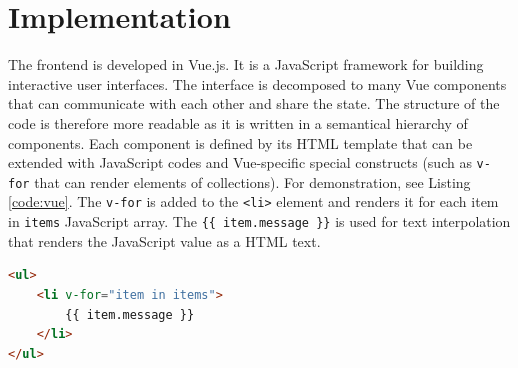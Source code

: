 \section{Implementation}
The frontend is developed in Vue.js. It is a JavaScript framework for building
interactive user interfaces. The interface is decomposed to many Vue components
that can communicate with each other and share the state. The structure of the
code is therefore more readable as it is written in a semantical hierarchy of
components. Each component is defined by its HTML template that can be extended
with JavaScript codes and Vue-specific special constructs (such as
\texttt{v-for} that can render elements of collections). For demonstration,
see Listing \ref{code:vue}. The \texttt{v-for} is added to the \texttt{<li>}
element and renders it for each item in \texttt{items} JavaScript array. The
\texttt{\{\{ item.message \}\}} is used for text interpolation that renders the
JavaScript value as a HTML text.

\begin{lstlisting}[language=HTML, caption=Vue.js template example]
<ul>
    <li v-for="item in items">
        {{ item.message }}
    </li>
</ul>
\end{lstlisting}
\label{code:vue}


